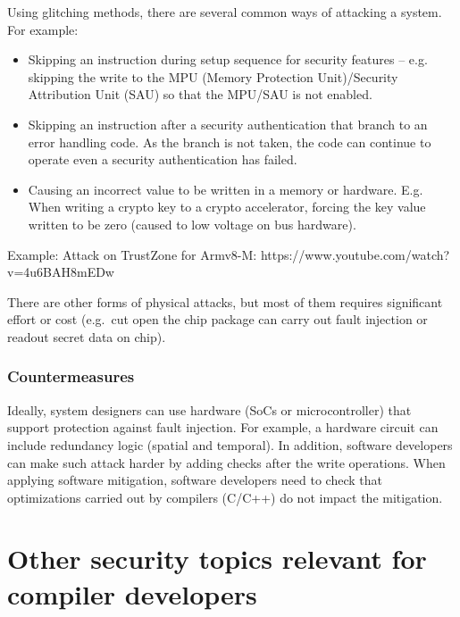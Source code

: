 \documentclass[a4paper,]{report}
\providecommand{\tightlist}{%
  \setlength{\itemsep}{0pt}\setlength{\parskip}{0pt}}
\begin{document}
Using glitching methods, there are several common ways of attacking a
system. For example:

\begin{itemize}
\tightlist
\item
  Skipping an instruction during setup sequence for security features --
  e.g. skipping the write to the MPU (Memory Protection Unit)/Security
  Attribution Unit (SAU) so that the MPU/SAU is not enabled.
\item
  Skipping an instruction after a security authentication that branch to
  an error handling code. As the branch is not taken, the code can
  continue to operate even a security authentication has failed.
\item
  Causing an incorrect value to be written in a memory or hardware. E.g.
  When writing a crypto key to a crypto accelerator, forcing the key
  value written to be zero (caused to low voltage on bus hardware).
\end{itemize}

Example: Attack on TrustZone for Armv8-M:
https://www.youtube.com/watch?v=4u6BAH8mEDw

There are other forms of physical attacks, but most of them requires
significant effort or cost (e.g.~cut open the chip package can carry out
fault injection or readout secret data on chip).

\hypertarget{countermeasures-1}{%
\subsection{Countermeasures}\label{countermeasures-1}}

Ideally, system designers can use hardware (SoCs or microcontroller)
that support protection against fault injection. For example, a hardware
circuit can include redundancy logic (spatial and temporal). In
addition, software developers can make such attack harder by adding
checks after the write operations. When applying software mitigation,
software developers need to check that optimizations carried out by
compilers (C/C++) do not impact the mitigation.

\hypertarget{other-security-topics-relevant-for-compiler-developers}{%
\chapter{Other security topics relevant for compiler
developers}\label{other-security-topics-relevant-for-compiler-developers}}
\end{document}
